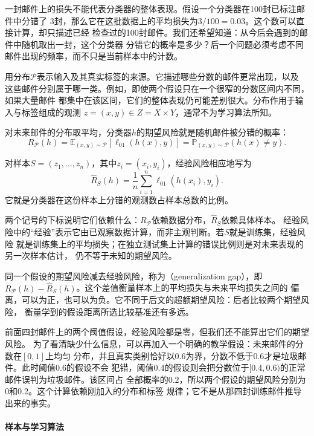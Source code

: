 一封邮件上的损失不能代表分类器的整体表现。假设一个分类器在100封已标注邮件中分错了
3封，那么它在这批数据上的平均损失为$3/100=0.03$。这个数可以直接计算，却只描述已经
检查过的100封邮件。我们还希望知道：从今后会遇到的邮件中随机取出一封，这个分类器
分错它的概率是多少？后一个问题必须考虑不同邮件出现的频率，而不只是当前样本中的计数。

用分布$\mathcal P$表示输入及其真实标签的来源。它描述哪些分数的邮件更常出现，以及
这些邮件分别属于哪一类。例如，即使两个假设只在一个很窄的分数区间内不同，如果大量邮件
都集中在该区间，它们的整体表现仍可能差别很大。分布作用于输入与标签组成的观测
$z=(x,y)\in Z=X\times Y$，通常不为学习算法所知。

对未来邮件的分布取平均，分类器$h$的期望风险就是随机邮件被分错的概率：
\begin{equation}
 R_{\mathcal P}(h)
 =\mathbb E_{(x,y)\sim\mathcal P}[\ell_{01}(h(x),y)]
 =\mathbb P_{(x,y)\sim\mathcal P}(h(x)\neq y).
 \label{eq:population-classification-risk}
\end{equation}

对样本$S=(z_1,\ldots,z_n)$，其中$z_i=(x_i,y_i)$，经验风险相应地写为
\begin{equation}
 \hat R_S(h)=\frac1n\sum_{i=1}^n\ell_{01}(h(x_i),y_i).
 \label{eq:empirical-classification-risk}
\end{equation}
它就是分类器在这份样本上分错的观测数占样本总数的比例。

两个记号的下标说明它们依赖什么：$R_{\mathcal P}$依赖数据分布，$\hat R_S$依赖具体样本。
经验风险中的“经验”表示它由已观察数据计算，而非主观判断。若$S$就是训练集，经验风险
就是训练集上的平均损失；在独立测试集上计算的错误比例则是对未来表现的另一次样本估计，
仍不等于未知的期望风险。

同一个假设的期望风险减去经验风险，称为（generalization gap），即
$R_{\mathcal P}(h)-\hat R_S(h)$。这个差值衡量样本上的平均损失与未来平均损失之间的
偏离，可以为正，也可以为负。它不同于后文的超额期望风险：后者比较两个期望风险，
衡量学到的假设距离所选比较基准还有多远。

前面四封邮件上的两个阈值假设，经验风险都是零，但我们还不能算出它们的期望风险。
为了看清缺少什么信息，可以再加入一个明确的教学假设：未来邮件的分数在$[0,1]$上均匀
分布，并且真实类别恰好以0.6为界，分数不低于0.6才是垃圾邮件。此时阈值0.6的假设不会
犯错，阈值0.4的假设则会把分数位于$[0.4,0.6)$的正常邮件误判为垃圾邮件。该区间占
全部概率的$0.2$，所以两个假设的期望风险分别为0和0.2。这个计算依赖刚加入的分布和标签
规律；它不是从那四封训练邮件推导出来的事实。

\paragraph{样本与学习算法}

